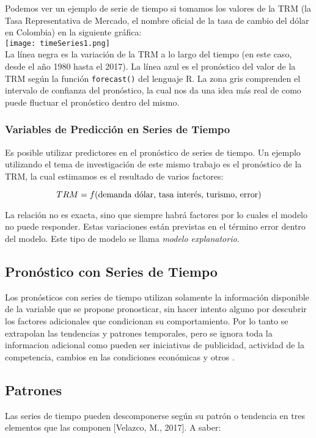 Podemos ver un ejemplo de serie de tiempo si tomamos los valores de la TRM (la Tasa Representativa de Mercado, el nombre oficial de la tasa de cambio del dólar en Colombia) en la siguiente gráfica:\\

\texttt{[image: timeSeries1.png]}\\

La línea negra es la variación de la TRM a lo largo del tiempo (en este caso, desde el año 1980 hasta el 2017). La línea azul es el pronóstico del valor de la TRM según la función \texttt{forecast()} del lenguaje R. La zona gris comprenden el intervalo de confianza del pronóstico, la cual nos da una idea más real de como puede fluctuar el pronóstico dentro del mismo. 

\subsubsection*{Variables de Predicción en Series de Tiempo}
Es posible utilizar predictores en el pronóstico de series de tiempo. Un ejemplo utilizando el tema de investigación de este mismo trabajo es el pronóstico de la TRM, la cual estimamos es el resultado de varios factores:

\[ TRM = f(\textnormal{demanda dólar, tasa interés, turismo, error}) \]

La relación no es exacta, sino que siempre habrá factores por lo cuales el modelo no puede responder. Estas variaciones están previstas en el término error dentro del modelo. Este tipo de modelo se llama \emph{modelo explanatorio}. 


\subsection*{Pronóstico con Series de Tiempo}
Los pronósticos con series de tiempo utilizan solamente la información disponible de la variable que se propone pronosticar, sin hacer intento alguno por descubrir los factores adicionales que condicionan su comportamiento. Por lo tanto se extrapolan las tendencias y patrones temporales, pero se ignora toda la informacion adicional como pueden ser iniciativas de publicidad, actividad de la competencia, cambios en las condiciones económicas y otros \cite{hyndman}.

\subsection*{Patrones}
Las series de tiempo pueden descomponerse según su patrón o tendencia en tres elementos que las componen [Velazco, M., 2017]. A saber:


